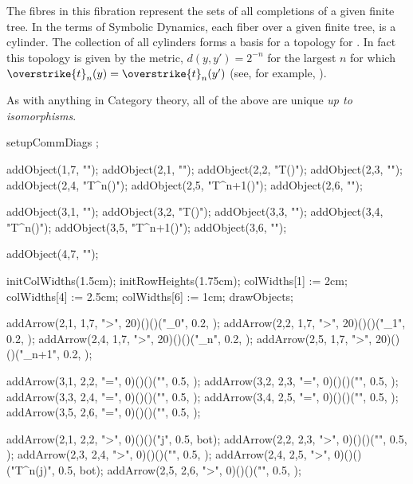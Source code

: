 The fibres in this fibration represent the sets of all completions of a 
given finite tree. In the terms of Symbolic Dynamics, each fiber over a 
given finite tree, is a cylinder. The collection of all cylinders forms a 
basis for a topology for \lol. In fact this topology is given by the 
metric, $d(y, y') = 2^{-n}$ for the largest $n$ for which 
$\overstrike{t}_n(y) = \overstrike{t}_n(y')$ (see, for example, 
\cite{barr1993terminalCoalgebrasWellFounded}). 

\stopitemize

\noindent As with anything in Category theory, all of the above are unique 
\emph{up to isomorphisms}. 

\item {} 

\stopitemize
\placeformula[left]\startformula {}
  setupCommDiags ; 
  
  addObject(1,7, "\wflol");
  addObject(2,1, "\emptySet");
  addObject(2,2, "T(\emptySet)");
  addObject(2,3, "\cdots");
  addObject(2,4, "T^n(\emptySet)");
  addObject(2,5, "T^{n+1}(\emptySet)");
  addObject(2,6, "\cdots");
  
  addObject(3,1, "");
  addObject(3,2, "T()");
  addObject(3,3, "\cdots");
  addObject(3,4, "T^n()");
  addObject(3,5, "T^{n+1}()");
  addObject(3,6, "\cdots");
  
  addObject(4,7, "\lol");

  initColWidths(1.5cm);
  initRowHeights(1.75cm);
  colWidths[1] := 2cm;
  colWidths[4] := 2.5cm;
  colWidths[6] := 1cm;
  drawObjects;

  addArrow(2,1, 1,7, ">", 20)()()("_0",     0.2, );
  addArrow(2,2, 1,7, ">", 20)()()("_1",     0.2, );
  addArrow(2,4, 1,7, ">", 20)()()("_n",     0.2, );
  addArrow(2,5, 1,7, ">", 20)()()("_{n+1}", 0.2, );
  
  addArrow(3,1, 2,2, "=", 0)()()("",           0.5, );
  addArrow(3,2, 2,3, "=", 0)()()("",           0.5, );
  addArrow(3,3, 2,4, "=", 0)()()("",           0.5, );
  addArrow(3,4, 2,5, "=", 0)()()("",           0.5, );
  addArrow(3,5, 2,6, "=", 0)()()("",           0.5, );

  addArrow(2,1, 2,2, ">", 0)()()("j",          0.5, bot);
  addArrow(2,2, 2,3, ">", 0)()()("",           0.5, );
  addArrow(2,3, 2,4, ">", 0)()()("",           0.5, );
  addArrow(2,4, 2,5, ">", 0)()()("T^n(j)",     0.5, bot);
  addArrow(2,5, 2,6, ">", 0)()()("",           0.5, );


